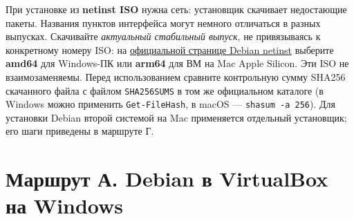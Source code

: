 При установке из \textbf{netinst ISO} нужна сеть: установщик скачивает
недостающие пакеты. Названия пунктов интерфейса могут немного отличаться
в разных выпусках. Скачивайте \emph{актуальный стабильный выпуск}, не
привязываясь к конкретному номеру ISO: на
\href{https://www.debian.org/distrib/netinst}{официальной странице
Debian netinst} выберите \textbf{amd64} для Windows-ПК или
\textbf{arm64} для ВМ на Mac Apple Silicon. Эти ISO не взаимозаменяемы.
Перед использованием сравните контрольную сумму SHA256 скачанного файла
с файлом \texttt{SHA256SUMS} в том же официальном каталоге (в Windows
можно применить \texttt{Get-FileHash}, в macOS ---
\texttt{shasum\ -a\ 256}). Для установки Debian второй системой на Mac
применяется отдельный установщик; его шаги приведены в маршруте Г.

\hypertarget{ux43cux430ux440ux448ux440ux443ux442-ux430-debian-ux432-virtualbox-ux43dux430-windows}{%
\section{Маршрут А. Debian в VirtualBox на
Windows}\label{ux43cux430ux440ux448ux440ux443ux442-ux430-debian-ux432-virtualbox-ux43dux430-windows}}

